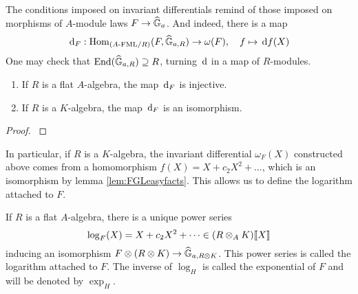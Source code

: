 \documentclass[../main.tex]{subfiles}
\begin{document}
The conditions imposed on invariant differentials remind of those imposed on 
morphisms of $A$-module laws $F \to \widehat{\mathbb{G}}_a$. And indeed, there is a map
\begin{equation} \label{eq:functorinvdifftohom}
  \, \mathrm{d}_F : \operatorname{Hom}_{{({A}\text-\mathrm{FML}/{R})}} (F, \widehat{\mathbb{G}}_{a,R}) \to \omega(F), \quad f \mapsto \, \mathrm{d} f(X)
\end{equation}
One may check that $\operatorname{End}(\widehat{\mathbb{G}}_{a,R}) \supseteq R$, turning $\, \mathrm{d}$ in a map of $R$-modules.
\begin{prop}
  \begin{enumerate}
    \item If $R$ is a flat $A$-algebra, the map $\, \mathrm{d}_F$ is injective.
    \item If $R$ is a $K$-algebra, the map $\, \mathrm{d}_F$ is an isomorphism.
  \end{enumerate}
\begin{proof}
  \cite[Chapter 3]{hopkins1994equivariant} 
\end{proof}
\end{prop}

In particular, if $R$ is a $K$-algebra, the invariant differential 
$\omega_F(X)$ constructed above comes from a homomorphism $f(X) = X + c_2 X^2 + \dots$,
which is an isomorphism by lemma \ref{lem:FGLeasyfacts}. 
This allows us to define the logarithm attached to $F$.
\begin{defi}
  If $R$ is a flat $A$-algebra, there is a unique power series
  \begin{equation*}
    \log_F(X) = X + c_2 X^2 + \dots \in (R \otimes_A K)\llbracket X \rrbracket 
  \end{equation*}
  inducing an isomorphism $F \otimes (R \otimes K) \to \widehat{\mathbb{G}}_{a,R\otimes K}$.
  This power series is called the logarithm attached to $F$. 
  The inverse of $\log_H$ is called the exponential of $F$ and will be denoted by
  $\exp_H$.
\end{defi}
\end{document}
